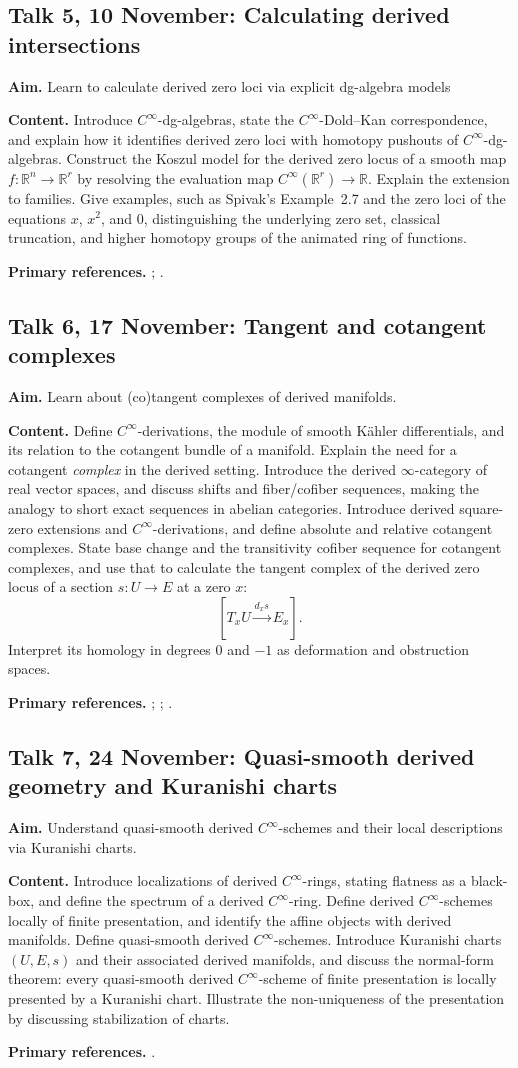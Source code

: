 \documentclass[11pt,a4paper]{article}
\newcommand{\Cinfty}{\ensuremath{C^\infty}}
\newcommand{\Talk}[6]{%
  \subsection*{Talk #1, #2: #3}
  \textbf{Aim.} #4

  \textbf{Content.} #5

  \textbf{Primary references.} #6
  \par\medskip
}
\begin{document}
\Talk{5}{10 November}{Calculating derived intersections}
{Learn to calculate derived zero loci via explicit dg-algebra models}
{Introduce \Cinfty-dg-algebras, state the \Cinfty-Dold--Kan correspondence, and explain how it identifies derived zero loci with homotopy pushouts of \Cinfty-dg-algebras. Construct the Koszul model for the derived zero locus of a smooth map $f\colon\mathbb R^n\to\mathbb R^r$ by resolving the evaluation map $\Cinfty(\mathbb R^r)\to\mathbb R$. Explain the extension to families. Give examples, such as Spivak's Example~2.7 and the zero loci of the equations $x$, $x^2$, and $0$, distinguishing the underlying zero set, classical truncation, and higher homotopy groups of the animated ring of functions.}
{\textcite[Definition~3.3.1, Theorem~3.3.12, and Examples~3.3.16--3.3.17]{Steffens_Derived_Cinfty_Geometry_I};
\textcite[Example~2.7]{Spivak_Derived_Smooth_Manifolds}.}

\Talk{6}{17 November}{Tangent and cotangent complexes}
{Learn about (co)tangent complexes of derived manifolds.}
{Define $\Cinfty$-derivations, the module of smooth K\"ahler differentials, and its relation to the cotangent bundle of a manifold. Explain the need for a cotangent \emph{complex} in the derived setting. Introduce the derived $\infty$-category of real vector spaces, and discuss shifts and fiber/cofiber sequences, making the analogy to short exact sequences in abelian categories. Introduce derived square-zero extensions and \Cinfty-derivations, and define absolute and relative cotangent complexes. State base change and the transitivity cofiber sequence for cotangent complexes, and use that to calculate the tangent complex of the derived zero locus of a section $s\colon U\to E$ at a zero $x$:
\[
  [T_xU\xrightarrow{d_xs}E_x].
\]
Interpret its homology in degrees $0$ and $-1$ as deformation and obstruction spaces.}
{\textcite[Section~5]{Steffens_Derived_Differential_Geometry};
\textcite{Pascarella_Cotangent_Complex_Derived_Differential_Geometry};
\textcite[Section~7]{Spivak_Derived_Smooth_Manifolds}.}

\Talk{7}{24 November}{Quasi-smooth derived geometry and Kuranishi charts}
{Understand quasi-smooth derived \Cinfty-schemes and their local descriptions via Kuranishi charts.}
{Introduce localizations of derived $\Cinfty$-rings, stating flatness as a black-box, and define the spectrum of a derived $\Cinfty$-ring. Define derived \Cinfty-schemes locally of finite presentation, and identify the affine objects with derived manifolds. Define quasi-smooth derived \Cinfty-schemes. Introduce Kuranishi charts $(U,E,s)$ and their associated derived manifolds, and discuss the normal-form theorem: every quasi-smooth derived \Cinfty-scheme of finite presentation is locally presented by a Kuranishi chart. Illustrate the non-uniqueness of the presentation by discussing stabilization of charts.}
{\textcite[Chapter~1 and Sections~4.1.3 and~5.1.1]{Steffens_Derived_Differential_Geometry}.}
\end{document}
